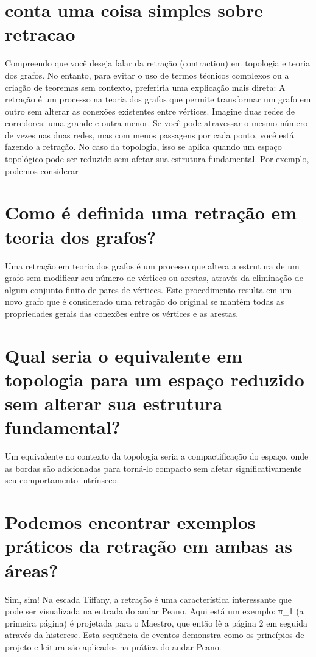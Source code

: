 \documentclass[11pt,a4paper]{article}
\begin{document}
\section{conta uma coisa simples sobre retracao}
Compreendo que você deseja falar da retração (contraction) em topologia e teoria dos grafos. No entanto, para evitar o uso de termos técnicos complexos ou a criação de teoremas sem contexto, preferiria uma explicação mais direta: A retração é um processo na teoria dos grafos que permite transformar um grafo em outro sem alterar as conexões existentes entre vértices. Imagine duas redes de corredores: uma grande e outra menor. Se você pode atravessar o mesmo número de vezes nas duas redes, mas com menos passagens por cada ponto, você está fazendo a retração. No caso da topologia, isso se aplica quando um espaço topológico pode ser reduzido sem afetar sua estrutura fundamental. Por exemplo, podemos considerar

\section{Como é definida uma retração em teoria dos grafos?}
Uma retração em teoria dos grafos é um processo que altera a estrutura de um grafo sem modificar seu número de vértices ou arestas, através da eliminação de algum conjunto finito de pares de vértices. Este procedimento resulta em um novo grafo que é considerado uma retração do original se mantêm todas as propriedades gerais das conexões entre os vértices e as arestas.

\section{Qual seria o equivalente em topologia para um espaço reduzido sem alterar sua estrutura fundamental?}
Um equivalente no contexto da topologia seria a compactificação do espaço, onde as bordas são adicionadas para torná-lo compacto sem afetar significativamente seu comportamento intrínseco.

\section{Podemos encontrar exemplos práticos da retração em ambas as áreas?}
Sim, sim! Na escada Tiffany, a retração é uma característica interessante que pode ser visualizada na entrada do andar Peano. Aqui está um exemplo: π\_1 (a primeira página) é projetada para o Maestro, que então lê a página 2 em seguida através da histerese. Esta sequência de eventos demonstra como os princípios de projeto e leitura são aplicados na prática do andar Peano.
\end{document}
